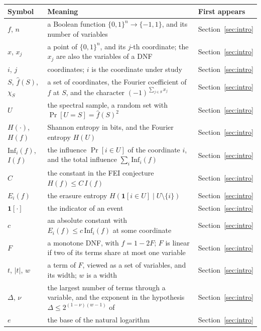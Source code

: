 \documentclass[11pt]{amsart}
\theoremstyle{remark}
\newcommand{\Inf}{\mathrm{Inf}}
\begin{document}
\begin{longtable}{@{}>{\raggedright\arraybackslash}p{}>{\raggedright\arraybackslash}p{}>{\raggedright\arraybackslash}p{}@{}}
\toprule
Symbol & Meaning & First appears \\
\midrule
\endhead
$f$, $n$ & a Boolean function $\{0,1\}^n\to\{-1,1\}$, and its number of variables & Section~\ref{sec:intro} \\
$x$, $x_j$ & a point of $\{0,1\}^n$, and its $j$-th coordinate; the $x_j$ are also the variables of a DNF & Section~\ref{sec:intro} \\
$i$, $j$ & coordinates; $i$ is the coordinate under study & Section~\ref{sec:intro} \\
$S$, $\hat f(S)$, $\chi_S$ & a set of coordinates, the Fourier coefficient of $f$ at $S$, and the character $(-1)^{\sum_{j\in S}x_j}$ & Section~\ref{sec:intro} \\
$U$ & the spectral sample, a random set with $\Pr[U=S]=\hat f(S)^2$ & Section~\ref{sec:intro} \\
$H(\cdot)$, $H(f)$ & Shannon entropy in bits, and the Fourier entropy $H(U)$ & Section~\ref{sec:intro} \\
$\Inf_i(f)$, $I(f)$ & the influence $\Pr[i\in U]$ of the coordinate $i$, and the total influence $\sum_i\Inf_i(f)$ & Section~\ref{sec:intro} \\
$C$ & the constant in the FEI conjecture $H(f)\le C\,I(f)$ & Section~\ref{sec:intro} \\
$E_i(f)$ & the erasure entropy $H(\mathbf 1[i\in U]\mid U\setminus\{i\})$ & Section~\ref{sec:intro} \\
$\mathbf 1[\cdot]$ & the indicator of an event & Section~\ref{sec:intro} \\
$c$ & an absolute constant with $E_i(f)\le c\,\Inf_i(f)$ at some coordinate & Section~\ref{sec:intro} \\
$F$ & a monotone DNF, with $f=1-2F$; $F$ is linear if two of its terms share at most one variable & Section~\ref{sec:intro} \\
$t$, $|t|$, $w$ & a term of $F$, viewed as a set of variables, and its width; $w$ is a width & Section~\ref{sec:intro} \\
$\Delta$, $\nu$ & the largest number of terms through a variable, and the exponent in the hypothesis $\Delta\le2^{(1-\nu)(w-1)}$ of~\cite{Shm6} & Section~\ref{sec:intro} \\
$e$ & the base of the natural logarithm & Section~\ref{sec:intro} \\

\end{longtable}
\end{document}
